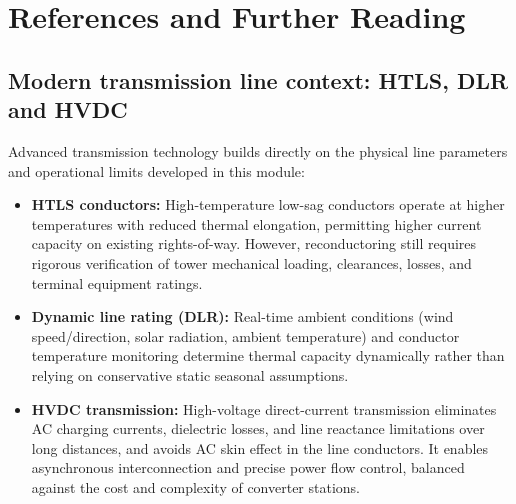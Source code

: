 \documentclass[11pt,a4paper]{article}
\newcommand{\chapterstart}[2]{\clearpage\section{#1}\label{#2}}
\begin{document}
\chapterstart{References and Further Reading}{coverage}
\subsection{Modern transmission line context: HTLS, DLR and HVDC}
Advanced transmission technology builds directly on the physical line parameters and operational limits developed in this module:
\begin{itemize}
\item \textbf{HTLS conductors:} High-temperature low-sag conductors operate at higher temperatures with reduced thermal elongation, permitting higher current capacity on existing rights-of-way. However, reconductoring still requires rigorous verification of tower mechanical loading, clearances, losses, and terminal equipment ratings.
\item \textbf{Dynamic line rating (DLR):} Real-time ambient conditions (wind speed/direction, solar radiation, ambient temperature) and conductor temperature monitoring determine thermal capacity dynamically rather than relying on conservative static seasonal assumptions.
\item \textbf{HVDC transmission:} High-voltage direct-current transmission eliminates AC charging currents, dielectric losses, and line reactance limitations over long distances, and avoids AC skin effect in the line conductors. It enables asynchronous interconnection and precise power flow control, balanced against the cost and complexity of converter stations.
\end{itemize}
\end{document}
